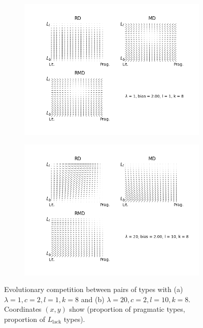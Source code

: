 \documentclass[fleqn,reqno,10pt]{article}
\newcommand{\mylang}[1]{\ensuremath{L_{\text{#1}}}\xspace} %
\newcommand{\Llack}{\mylang{lack}}
\begin{document}
\begin{figure}
\centering
\begin{subfigure}{.6\textwidth}
  \centering
  \includegraphics[scale=0.4]{quiver-lam1-c200-k8-l1}
  \caption{}
  \label{fig:sub1b}
\end{subfigure}%
\begin{subfigure}{.6\textwidth}
  \centering
  \includegraphics[scale=0.4]{quiver-lam20-c200-k8-l10}
  \caption{}
  \label{fig:sub2b}
\end{subfigure}
\caption{Evolutionary competition between pairs of types with (a) $\lambda = 1, c = 2, l = 1, k = 8$ and (b) $\lambda = 20, c = 2, l =10, k =8$. Coordinates $(x,y)$ show (proportion of pragmatic types, proportion of $\Llack$ types).}
\label{fig:quiverb}
\end{figure}
\end{document}
